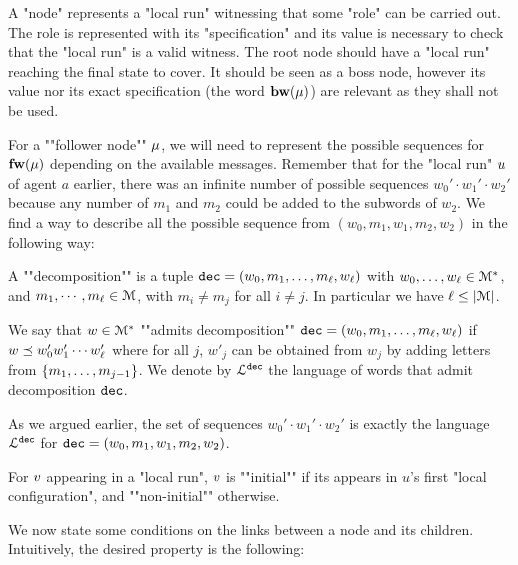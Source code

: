 A "node" represents a "local run" witnessing that some "role" can be carried out. The role is represented with its "specification" and its value is necessary to check that the "local run" is a valid witness.
The root node should have a "local run" reaching the final state to cover. It should be seen as a boss node, however its value nor its exact specification (the word $\mathbf{bw}(\mu)$) are relevant as they shall not be used.

For a ""follower node"" $\mu$, we will need to represent the possible sequences for $\mathbf{fw}(\mu)$ depending on the available messages. Remember that for the "local run" $u$ of agent $a$ earlier, there was an infinite number of possible sequences $w_0' \cdot w_1' \cdot w_2'$ because any number of $m_1$ and $m_2$ could be added to the subwords of $w_2$. We find a way to describe all the possible sequence from $(w_0, m_1, w_1, m_2, w_2)$ in the following way:

A ""decomposition"" is a tuple $\mathtt{dec} = (w_0, m_1, \ldots, m_\ell, w_\ell)$ with $w_0, \ldots, w_\ell \in \mathcal{M}^*$, and $m_1, \cdots, m_\ell \in \mathcal{M}$, with $m_i \neq m_j$ for all $i\neq j$. In particular we have $\ell \leq |\mathcal{M}|$. 

We say that $w \in \mathcal{M}^*$ ""admits decomposition"" $\mathtt{dec} = (w_0, m_1, \ldots, m_\ell, w_\ell)$ if $w \preceq w'_0 w'_1 \cdots w'_\ell$ where for all $j$, $w'_j$ can be obtained from $w_j$ by adding letters from $\{m_1, \ldots, m_{j-1}\}$.
We denote by $\mathcal{L}^{\mathtt{\mathtt{dec}}}$ the language of words that admit decomposition $\mathtt{dec}$. 

As we argued earlier, the set of sequences $w_0' \cdot w_1' \cdot w_2'$ is exactly the language $\mathcal{L}^{\mathtt{\mathtt{dec}}}$ for $\mathtt{dec} = (w_0, m_1, w_1, m_2, w_2)$.

For $v$ appearing in a "local run", $v$ is ""initial"" if its appears in $u$'s first "local configuration", and ""non-initial"" otherwise. 


We now state some conditions on the links between a node and its children. Intuitively, the desired property is the following: 

